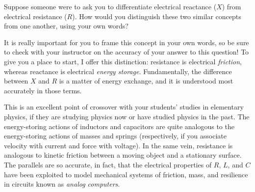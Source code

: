 

Suppose someone were to ask you to differentiate electrical reactance ($X$) from electrical resistance ($R$).  How would you distinguish these two similar concepts from one another, using your own words?







It is really important for you to frame this concept in your own words, so be sure to check with your instructor on the accuracy of your answer to this question!  To give you a place to start, I offer this distinction: resistance is electrical {\it friction}, whereas reactance is electrical {\it energy storage}.  Fundamentally, the difference between $X$ and $R$ is a matter of energy exchange, and it is understood most accurately in those terms.







This is an excellent point of crossover with your students' studies in elementary physics, if they are studying physics now or have studied physics in the past.  The energy-storing actions of inductors and capacitors are quite analogous to the energy-storing actions of masses and springs (respectively, if you associate velocity with current and force with voltage).  In the same vein, resistance is analogous to kinetic friction between a moving object and a stationary surface.  The parallels are so accurate, in fact, that the electrical properties of $R$, $L$, and $C$ have been exploited to model mechanical systems of friction, mass, and resilience in circuits known as {\it analog computers}.




